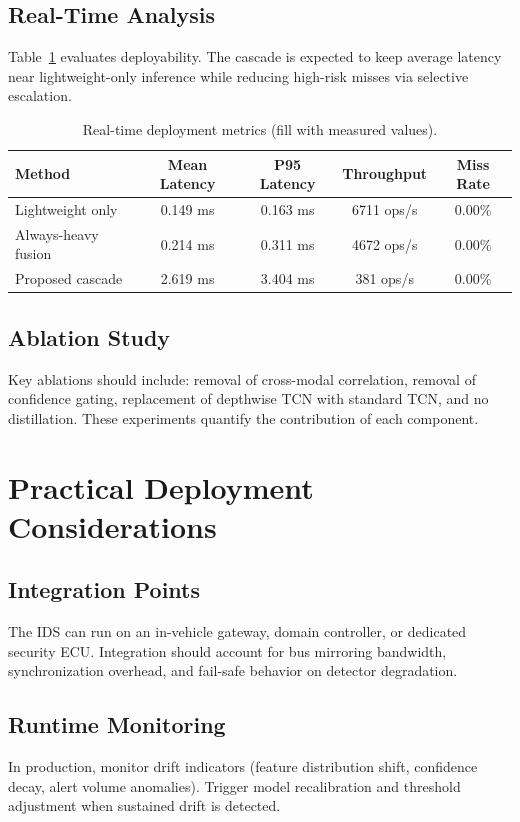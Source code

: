 \documentclass[conference]{IEEEtran}
\begin{document}
\subsection{Real-Time Analysis}
Table~\ref{tab:realtime} evaluates deployability. The cascade is expected to keep average latency near lightweight-only inference while reducing high-risk misses via selective escalation.

\begin{table}[t]
\centering
\caption{Real-time deployment metrics (fill with measured values).}
\label{tab:realtime}
\scriptsize
\begin{tabular}{lcccc}
\toprule
Method & Mean Latency & P95 Latency & Throughput & Miss Rate \\
\midrule
Lightweight only & 0.149 ms & 0.163 ms & 6711 ops/s & 0.00\% \\
Always-heavy fusion & 0.214 ms & 0.311 ms & 4672 ops/s & 0.00\% \\
Proposed cascade & 2.619 ms & 3.404 ms & 381 ops/s & 0.00\% \\
\bottomrule
\end{tabular}
\end{table}

\subsection{Ablation Study}
Key ablations should include: removal of cross-modal correlation, removal of confidence gating, replacement of depthwise TCN with standard TCN, and no distillation. These experiments quantify the contribution of each component.

\section{Practical Deployment Considerations}
\subsection{Integration Points}
The IDS can run on an in-vehicle gateway, domain controller, or dedicated security ECU. Integration should account for bus mirroring bandwidth, synchronization overhead, and fail-safe behavior on detector degradation.

\subsection{Runtime Monitoring}
In production, monitor drift indicators (feature distribution shift, confidence decay, alert volume anomalies). Trigger model recalibration and threshold adjustment when sustained drift is detected.
\end{document}
